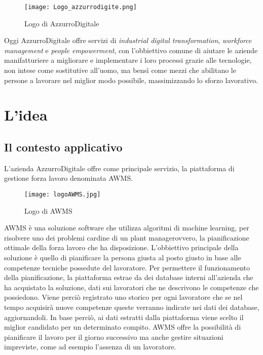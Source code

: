 \begin{figure}[h]
	\begin{center}
		\texttt{[image: Logo\_azzurrodigite.png]}
			\caption{Logo di AzzurroDigitale}
	\end{center}
\end{figure}
\pagebreak

Oggi AzzurroDigitale offre servizi di \emph{industrial digital transformation}, \emph{workforce management} e \emph{people empowerment}, con l'obbiettivo comune di aiutare le aziende manifatturiere a migliorare e implementare i loro processi grazie alle tecnologie, non intese come sostitutive all’uomo, ma bensì come mezzi che abilitano le persone a lavorare nel miglior modo possibile, massimizzando lo sforzo lavorativo.\\

\section{L'idea}

\subsection{Il contesto applicativo}
L'azienda AzzurroDigitale offre come principale servizio, la piattaforma di gestione forza lavoro denominata \gls{AWMS}\ap{[g]}.\\
	\begin{figure}[!h] 
		\begin{center}
			\texttt{[image: logoAWMS.jpg]}
			\caption{Logo di AWMS}
		\end{center}
	\end{figure}

\gls{AWMS}\ap{[g]} è una soluzione software che utilizza algoritmi di \gls{machine learning}\glsfirstoccur, per risolvere uno dei problemi cardine di un \gls{plant manager}\glsfirstoccur ovvero, la pianificazione ottimale della forza lavoro che ha disposizione. L'obbiettivo principale della soluzione è quello di pianificare la persona giusta al posto giusto in base alle competenze tecniche possedute del lavoratore. Per permettere il funzionamento della pianificazione, la piattaforma estrae da dei database interni all'azienda che ha acquistato la soluzione, dati sui lavoratori che ne descrivono le competenze che possiedono. Viene perciò registrato uno storico per ogni lavoratore che se nel tempo acquisirà nuove competenze queste verranno indicate nei dati dei database, aggiornandoli. In base perciò, ai dati estratti dalla piattaforma viene scelto il miglior candidato per un determinato compito. \gls{AWMS}\ap{[g]} offre la possibilità di pianificare il lavoro per il giorno successivo ma anche gestire situazioni impreviste, come ad esempio l'assenza di un lavoratore.

